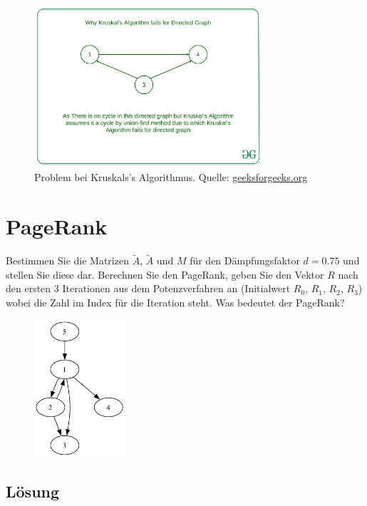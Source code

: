 \documentclass[a4paper,11pt]{report}
\begin{document}
    \begin{figure}[htbp]
        \centering
        \includegraphics[height=6cm]{a05a_kruskals_issue}
        \caption{Problem bei Kruskals's Algorithmus. Quelle: \href{https://www.geeksforgeeks.org/why-prims-and-kruskals-mst-algorithm-fails-for-directed-graph/}{geeksforgeeks.org}}
        \label{fig:a05_kruskal}
    \end{figure}
    \newpage

    \chapter{PageRank}
    \label{ch:pageRank}
    Bestimmen Sie die Matrizen $\widetilde{A}$, $\widetilde{A}$ und $M$ für den Dämpfungsfaktor $d = 0.75$ und stellen Sie diese dar.
    Berechnen Sie den PageRank, geben Sie den Vektor $R$ nach den ersten $3$ Iterationen aus dem Potenzverfahren an (Initialwert $R_0$, $R_1$, $R_2$, $R_3$) wobei die Zahl im Index für die Iteration steht.
    Was bedeutet der PageRank?

    \begin{figure}[H]
        \includegraphics[width=0.3\textwidth]{a06a_graph}
        \label{fig:a06_graph}
    \end{figure}

    \section{Lösung}
\end{document}
